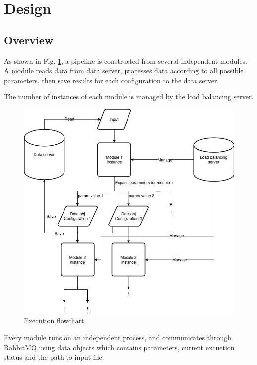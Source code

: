 \documentclass{article}
\begin{document}
\section{Design}

    \subsection{Overview}

    As shown in Fig. \ref{fig:flow},
    a pipeline is constructed from several independent modules.
    A module reads data from data server,
    processes data according to all possible parameters,
    then save results for each configuration to the data server.

    The number of instances of each module is managed by the load balancing server.

    \begin{figure}[h]
        \begin{center}
            \includegraphics[width=\textwidth]{fig/flow.png}
        \end{center}
        \label{fig:flow}
        \caption{Execution flowchart.}
    \end{figure}

    Every module runs on an independent process,
    and communicates through RabbitMQ using data objects which contains parameters, current excuetion status and the path to input file.
\end{document}
